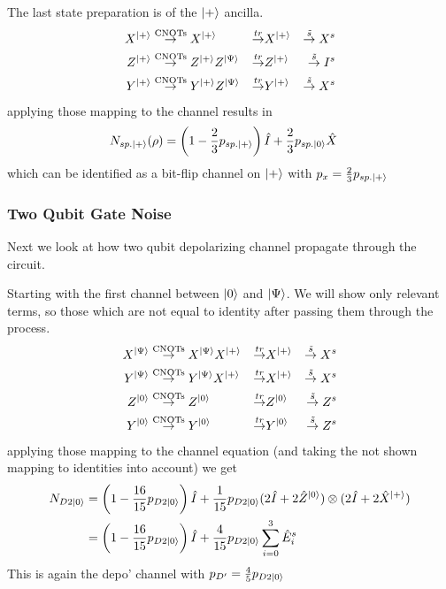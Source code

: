 The last state preparation is of the $\ket{+}$ ancilla. 
\begin{align*}
    X^{\ket{+}}  
    &\overset{\text{CNOTs}}{\rightarrow} X^{\ket{+}} 
    &\overset{tr}{\rightarrow} & X^{\ket{+}} 
    &\overset{\tilde{s}}{\rightarrow} X^s  \\
    Z^{\ket{+}}  
    &\overset{\text{CNOTs}}{\rightarrow} Z^{\ket{+}} Z^{\ket{\Psi}} 
    &\overset{tr}{\rightarrow} & Z^{\ket{+}}   
    &\overset{\tilde{s}}{\rightarrow} I^s  \\
    Y^{\ket{+}}  
    &\overset{\text{CNOTs}}{\rightarrow} Y^{\ket{+}} Z^{\ket{\Psi}} 
    &\overset{tr}{\rightarrow} & Y^{\ket{+}} 
    &\overset{\tilde{s}}{\rightarrow} X^s  \\
\end{align*} 
applying those mapping to the channel results in 
\begin{align*}
    N_{sp.\ket{+}} (\rho) &= \left(1-\frac{2}{3}p_{sp.\ket{+}}\right) \hat{I} + \frac{2}{3}p_{sp.\ket{0}} \hat{X}^{}
\end{align*}
which can be identified as a bit-flip channel on $\ket{+}$ with $p_x=\frac{2}{3} p_{sp.\ket{+}}$

\subsubsection{Two Qubit Gate Noise}
Next we look at how two qubit depolarizing channel propagate through the circuit.

Starting with the first channel between $\ket{0}$ and $\ket{\Psi}$.
We will show only relevant terms, so those which are not equal to identity after passing them through the process. 
\begin{align*}
    X^{\ket{\Psi}} 
    &\overset{\text{CNOTs}}{\rightarrow} X^{\ket{\Psi}}  X^{\ket{+}}  
    &\overset{tr}{\rightarrow} & X^{\ket{+}} 
    &\overset{\tilde{s}}{\rightarrow} X^s  \\
    Y^{\ket{\Psi}} 
    &\overset{\text{CNOTs}}{\rightarrow} Y^{\ket{\Psi}}  X^{\ket{+}}  
    &\overset{tr}{\rightarrow} & X^{\ket{+}} 
    &\overset{\tilde{s}}{\rightarrow} X^s  \\
    Z^{\ket{0}}  
    &\overset{\text{CNOTs}}{\rightarrow} Z^{\ket{0}} 
    &\overset{tr}{\rightarrow} & Z^{\ket{0}}   
    &\overset{\tilde{s}}{\rightarrow} Z^s  \\
    Y^{\ket{0}}  
    &\overset{\text{CNOTs}}{\rightarrow} Y^{\ket{0}} 
    &\overset{tr}{\rightarrow} & Y^{\ket{0}}   
    &\overset{\tilde{s}}{\rightarrow} Z^s  \\
\end{align*} 
applying those mapping to the channel equation (and taking the not shown mapping to identities into account)  we get
\begin{align*}
    N_{D2\ket{0}} &= \left(1- \frac{16}{15} p_{D2\ket{0}} \right) \hat{I} + \frac{1}{15} p_{D2\ket{0}}(2\hat{I} + 2\hat{Z}^{\ket{0}}) \otimes (2\hat{I} + 2\hat{X}^{\ket{+}})\\
    &= \left(1- \frac{16}{15} p_{D2\ket{0}} \right) \hat{I} + \frac{4}{15}p_{D2\ket{0}} \sum_{i=0}^{3} \hat{E}_i^s 
\end{align*}
This is again the depo' channel with $p_{D'} = \frac{4}{5} p_{D2\ket{0}}$


